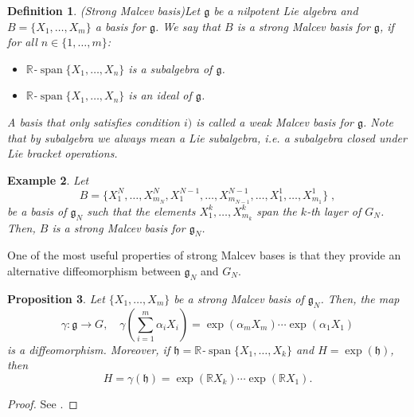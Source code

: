 \documentclass[pdflatex,sn-mathphys-num]{sn-jnl}
\theoremstyle{thmstyletwo}
\newtheorem{definition}{Definition}[section]
\theoremstyle{thmstyleone}
\newtheorem{proposition}[definition]{Proposition}
\theoremstyle{thmstyletwo}
\newtheorem{example}[definition]{Example}
\newcommand{\fancyh}{\mathfrak{h}}
\newcommand{\fancyg}{\mathfrak{g}}
\begin{document}
	\begin{definition}{(Strong Malcev basis)}\label{def: strong malcev basis}
		Let $\fancyg$ be a nilpotent Lie algebra and $B = \{X_1, \ldots, X_m\}$ a basis for $\fancyg$. We say that $B$ is a \textit{strong Malcev} basis for $\fancyg$, if for all $n \in \{1, \ldots, m\}$:
		\begin{itemize}
			\item [i)] $\mathbb{R}$-$\operatorname{span}\{X_1, \ldots, X_n\}$ is a subalgebra of $\fancyg$.
			\item[ii)] $\mathbb{R}$-$\operatorname{span}\{X_1, \ldots, X_n\}$ is an ideal of $\fancyg$.
		\end{itemize}
		A basis that only satisfies condition $i)$ is called a weak Malcev basis for $\fancyg$. Note that by subalgebra we always mean a Lie subalgebra, i.e. a subalgebra closed under Lie bracket operations.
	\end{definition}
	\begin{example}
		Let 
		\[B = \{X_1^N, \ldots, X_{m_N}^N, X_1^{N-1}, \ldots, X_{m_{N-1}}^{N-1}, \ldots, X_1^1, \ldots, X_{m_1}^1\} \;,\]
		be a basis of $\fancyg_{N}$ such that the elements $X_1^k, \ldots, X_{m_k}^k$ span the $k$-th layer of $G_N$. Then, $B$ is a strong Malcev basis for $\fancyg_{N}$.
	\end{example}
	
	One of the most useful properties of strong Malcev bases is that they provide an alternative diffeomorphism between $\fancyg_N$ and $G_N$.
	
	\begin{proposition}\label{prop: bijectivity of gamma}
		Let $\{X_1, \ldots, X_m\}$ be a strong Malcev basis of $\fancyg_N$. Then, the map 
		\begin{equation*}
			\gamma: \fancyg \to G,\quad \gamma\left(\sum_{i=1}^m\alpha_iX_i\right) = \exp(\alpha_mX_m)\cdots\exp(\alpha_1X_1)
		\end{equation*}
		is a diffeomorphism. Moreover, if $\fancyh = \mathbb{R}$-$\operatorname{span}\{X_1, \ldots, X_k\}$ and $H = \exp(\fancyh)$, then 
		\begin{equation*}
			H = \gamma(\fancyh) = \exp(\mathbb{R}X_k)\cdots\exp(\mathbb{R}X_1).
		\end{equation*}
	\end{proposition}
	\begin{proof}
		See \cite[Proposition~1.2.7]{corwin1990representations}.
	\end{proof}
	
\end{document}
